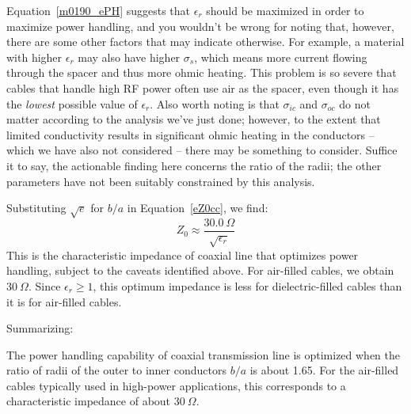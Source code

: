 Equation~\ref{m0190_ePH} suggests that $\epsilon_r$ should be maximized in order to maximize power handling, and you wouldn't be wrong for noting that, however, there are some other factors that may indicate otherwise.  For example, a material with higher $\epsilon_r$ may also have higher $\sigma_s$, which means more current flowing through the spacer and thus more ohmic heating.  This problem is so severe that cables that handle high RF power often use air as the spacer, even though it has the \emph{lowest} possible value of $\epsilon_r$. 
Also worth noting is that $\sigma_{ic}$ and $\sigma_{oc}$ do not matter according to the analysis we've just done; however, to the extent that limited conductivity results in significant ohmic heating in the conductors -- which we have also not considered -- there may be something to consider.
Suffice it to say, the actionable finding here concerns the ratio of the radii; the other parameters have not been suitably constrained by this analysis.

Substituting $\sqrt{e}$ for $b/a$ in Equation~\ref{eZ0cc}, we find:
\begin{equation}
Z_0 \approx \frac{30.0~\Omega}{\sqrt{\epsilon_r}} 
\end{equation}
This is the characteristic impedance of coaxial line that optimizes power handling, subject to the caveats identified above.  For air-filled cables, we obtain $30~\Omega$.  Since $\epsilon_r\ge 1$, this optimum impedance is less for dielectric-filled cables than it is for air-filled cables.  

Summarizing:
\begin{mdframed}[backgroundcolor=yellow!20,nobreak=true] 
The power handling capability of coaxial transmission line is optimized when the ratio of radii of the outer to inner conductors $b/a$ is about 1.65.  
For the air-filled cables typically used in high-power applications, this corresponds to a characteristic impedance of about $30~\Omega$.
\end{mdframed}

